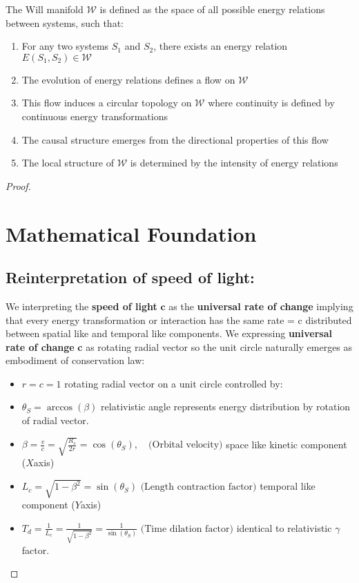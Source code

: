 \documentclass{article}
\begin{document}
\begin{theorem}
The Will manifold $\mathcal{W}$ is defined as the space of all possible energy relations between systems, such that:
\begin{enumerate}
    \item For any two systems $S_1$ and $S_2$, there exists an energy relation $E(S_1, S_2) \in \mathcal{W}$
    \item The evolution of energy relations defines a flow on $\mathcal{W}$
    \item This flow induces a circular topology on $\mathcal{W}$ where continuity is defined by continuous energy transformations
    \item The causal structure emerges from the directional properties of this flow
    \item The local structure of $\mathcal{W}$ is determined by the intensity of energy relations


\end{enumerate}

\begin{proof}

\section{Mathematical Foundation}

\subsection{Reinterpretation of speed of light:}

We interpreting the \textbf{speed of light} $\textbf{c}$ as the \textbf{universal rate of change} implying that every energy transformation or interaction has the same rate = c distributed  between spatial like and temporal like components. We expressing \textbf{universal rate of change}\textbf{ c} as rotating radial vector so the unit circle naturally emerges as embodiment of conservation law:

\begin{itemize}
    \item \textbf{$r=c = 1$} rotating radial vector on a unit circle controlled by:
    \item \textbf{$\theta_S = \arccos(\beta)$} relativistic angle represents energy distribution by rotation of radial vector.
\end{itemize}
\begin{itemize}
    \item  \textbf{$ \beta =  \frac{v}{c} = \sqrt{\frac{R_s}{2r}} =  \cos\left(\theta_S\right), \quad \text{(Orbital velocity)}$} space like kinetic component ($X$axis) 
\end{itemize}
    \begin{itemize}
        \item   $L_c =\sqrt{1-\beta^2} =\sin(\theta_S)\text{ (Length contraction factor)}$ temporal like component  ($Y$axis) 
        \item $T_d =\frac{1}{L_c}=\frac{1}{\sqrt{1-\beta^2} }=\frac{1}{\sin(\theta_S)}\text{ (Time dilation factor)}$ identical to relativistic $\gamma$ factor.
    \end{itemize}


\end{proof}
\end{theorem}
\end{document}
